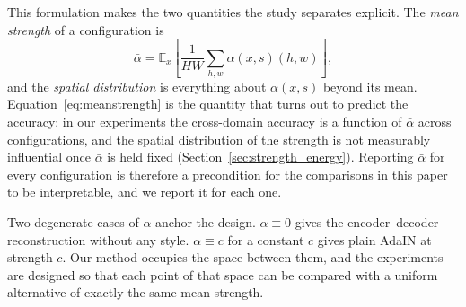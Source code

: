 This formulation makes the two quantities the study separates explicit.
The \emph{mean strength} of a configuration is
\begin{equation}
\bar{\alpha} = \mathbb{E}_{x}\left[\frac{1}{HW}\sum_{h,w} \alpha(x,s)(h,w)\right],
\label{eq:meanstrength}
\end{equation}
and the \emph{spatial distribution} is everything about $\alpha(x,s)$ beyond
its mean. Equation~\eqref{eq:meanstrength} is the quantity that turns out
to predict the accuracy: in our experiments the cross-domain accuracy is a
function of $\bar{\alpha}$ across configurations, and the spatial
distribution of the strength is not measurably influential once $\bar{\alpha}$
is held fixed (Section~\ref{sec:strength_energy}). Reporting $\bar{\alpha}$
for every configuration is therefore a precondition for the comparisons in
this paper to be interpretable, and we report it for each one.

Two degenerate cases of $\alpha$ anchor the design. $\alpha \equiv 0$ gives
the encoder--decoder reconstruction without any style. $\alpha \equiv c$ for
a constant $c$ gives plain AdaIN at strength $c$. Our method occupies the
space between them, and the experiments are designed so that each point of
that space can be compared with a uniform alternative of exactly the same
mean strength.
